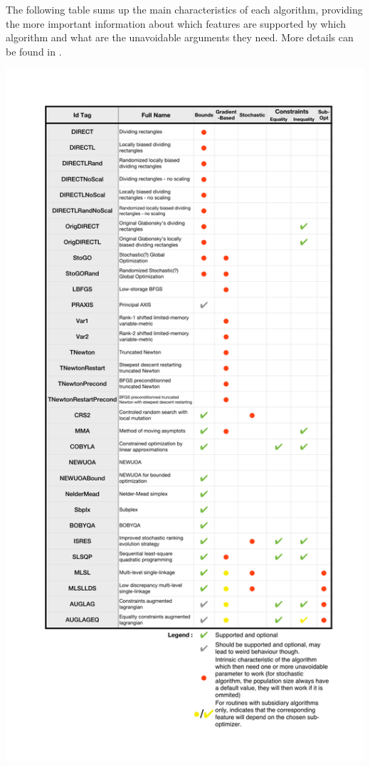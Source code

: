 \documentclass[a4paper,twoside,12pt]{book}
\begin{document}
The following table sums up the main characteristics of each algorithm, providing the more important information about which features are supported by which algorithm and what are the unavoidable arguments 
they need. More details can be found in \cite{nlopt}.
\begin{center}
\includegraphics [height=\textheight]{nlopttab}   
\end{center}
\end{document}
